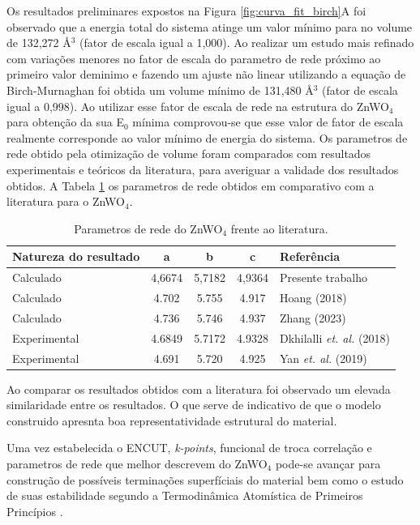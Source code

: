 Os resultados preliminares expostos na Figura \ref{fig:curva_fit_birch}A foi observado que a energia total do sistema atinge um valor mínimo para no volume de 132,272 \AA$^3$ (fator de escala igual a 1,000). Ao realizar um estudo mais refinado com variações menores no fator de escala do parametro de rede próximo ao primeiro valor deminimo e fazendo um ajuste não linear utilizando a equação de Birch-Murnaghan foi obtida um volume mínimo de 131,480 \AA$^3$ (fator de escala igual a 0,998). Ao utilizar esse fator de escala de rede na estrutura do ZnWO$_4$ para obtenção da sua E$_0$ mínima comprovou-se que esse valor de fator de escala realmente corresponde ao valor mínimo de energia do sistema. Os parametros de rede obtido pela otimização de volume foram comparados com resultados experimentais e teóricos da literatura, para averiguar a validade dos resultados obtidos. A Tabela \ref{tab:parametros_de_rede_ZnWO4} os parametros de rede obtidos em comparativo com a literatura para o ZnWO$_4$.

\FloatBarrier
\begin{table}[!htbp]
\centering
\caption{Parametros de rede do ZnWO$_4$ frente ao literatura.}
\label{tab:parametros_de_rede_ZnWO4}
\begin{tabular}{lccc p{5cm}}
\hline
\textbf{Natureza do resultado} & \textbf{a} & \textbf{b} & \textbf{c} & \textbf{Referência}
\\ \hline
Calculado & 4,6674 & 5,7182 & 4,9364 & Presente trabalho \\
Calculado &  4.702 &  5.755 & 4.917 & Hoang (2018) \cite{hoang2018electronic} \\
Calculado & 4.736 & 5.746 & 4.937 & Zhang (2023) \cite{zhang2023effect} \\
Experimental & 4.6849 & 5.7172 & 4.9328 & Dkhilalli \textit{et. al.} (2018) \cite{dkhilalli2018structural} \\
Experimental &  4.691 & 5.720 &  4.925 & Yan \textit{et. al.} (2019) \cite{yan2019study} \\

\hline
\end{tabular}
\end{table}
\FloatBarrier

Ao comparar os resultados obtidos com a literatura foi observado um elevada similaridade entre os resultados. O que serve de indicativo de que o modelo construido apresnta boa representatividade estrutural do material.

Uma vez estabelecida o ENCUT, \textit{k-points}, funcional de troca correlação e parametros de rede que melhor descrevem do ZnWO$_4$ pode-se avançar para construção de possíveis terminações superfíciais do material bem como o estudo de suas estabilidade segundo a Termodinâmica Atomística de Primeiros Princípios \cite{reuter2005ab,rogal2006}.

